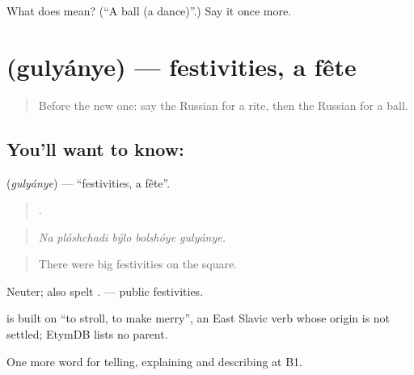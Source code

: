 \begin{tcolorbox}[breakable,colback=teal!4,colframe=teal!35!black,title={Before you move on}]
What does  mean? (\textquotedblleft{}A ball (a dance)\textquotedblright{}.) Say it once more.
\end{tcolorbox}
\section[\texorpdfstring{\ru{гулянье} (gulyánye)}{гулянье (gulyánye)}]{ (gulyánye) — festivities, a fête}

\label{lesson:RU-C318-gulyanye}



\begin{quote}
Before the new one: say the Russian for a rite, then the Russian for a ball.
\end{quote}

\subsection*{You'll want to know: }
\textbf{} (\emph{gulyánye}) — \textquotedblleft{}festivities, a fête\textquotedblright{}.

\begin{quote}
    .
\end{quote}

\begin{quote}
\emph{Na plóshchadi býlo bolshóye gulyánye.}
\end{quote}

\begin{quote}
There were big festivities on the square.
\end{quote}

Neuter; also spelt \emph{}. \emph{ } — public festivities.

\begin{cousinweb}
\emph{} is built on \emph{} \textquotedblleft{}to stroll, to make merry\textquotedblright{}, an East Slavic verb whose origin is not settled; EtymDB lists no parent.
\end{cousinweb}

\begin{grammarlens}[title={What you've built}]
One more word for telling, explaining and describing at B1.
\end{grammarlens}


